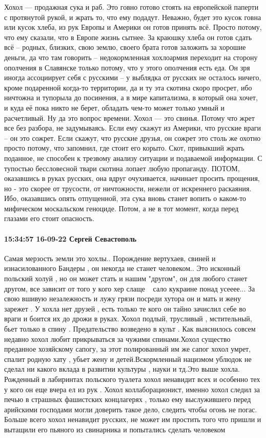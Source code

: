 Хохол — продажная сука и раб.
Это говно готово стоять на европейской паперти с протянутой рукой, и жрать то, что ему подадут. Неважно, будет это кусок говна или кусок хлеба, из рук Европы и Америки он готов принять всё. Просто потому, что ему сказали, что в Европе жизнь сытнее. За краюшку хлеба он готов сдать всё – родных, близких, свою землю, своего брата готов заложить за хорошие деньги, да что там говорить – недокормленная хохлоармия переходит на сторону ополчения в Славянске только потому, что у этого ополчения есть еда. Он зря иногда ассоциирует себя с русскими – у выблядка от русских не осталось ничего, кроме подаренной когда-то территории, да и ту эта скотина скоро просрет, ибо ничтожна и тупорыла до посинения, а в мире капитализма, в который она хочет, и куда её пока никто не берет, обладать чем-то может только умный и расчетливый. Ну да это вопрос времени.
Хохол — это свинья.
Потому что жрет все без разбора, не задумываясь. Если ему скажут из Америки, что русские враги – он это сожрет. Если скажут, что русские друзья, он сожрет это столь же охотно просто потому, что запомнил, где стоит его корыто. Скот, привыкший жрать поданное, не способен к трезвому анализу ситуации и подаваемой информации. С тупостью бессловесной твари скотина лопает любую пропаганду. ПОТОМ, оказавшись в руках русских, она вдруг очухивается, начинает просить прощения, но - это скорее от трусости, от ничтожности, нежели от искреннего раскаяния. Ибо, оказавшись опять отпущенной, эта сука вновь станет вопить о каком-то мифическом москальском геноциде. Потом, а не в тот момент, когда перед глазами его стоит опасность.

\paragraph{15:34:57 16-09-22 Сергей Севастополь}

Самая мерзость земли это хохлы.. Порождение вертухаев, свиней и изнасилованного
Бандеры , он некогда не станет человеком.. Это исконный польский холуй , но он
может стать и нашим "другом", он для любого станет другом, все зависит от того
у кого хер слаще🤢🤢🤢🤢сало кукраине понад усееее... За свою вшивую
незалежность и лужу грязи посреди хутора он и мать и жену зарежет . У хохла нет
друзей , есть только те кого он тайно зачислил себе во враги и боится их до
дрожи в руках. Хохол подлый, трусливый , мстительный, бьет только в спину .
Предательство возведено в культ . Как выяснилось совсем недавно хохол любит
прикрываться за чужими спинами.Хохол существо преданное хозяйскому сапогу, за
этот полированный им же сапог хохол умрет, спалит родную хату , убьет жену и
детей.Вскормленный нацизмом ублюдок не сделал ни какого вклада в развитии
культуры , науки и тд.Это выше хохла. Рожденный в лабиринтах польского туалета
хохол ненавидит всех и особенно тех у кого он еще вчера ел из рук . Хохол
коллаборационист, именно хохол следил за печью в страшных фашистских
концлагерях , только ему выслужившего перед арийскими господами могли доверить
такое дело, следить чтобы огонь не погас. Больше всего хохол ненавидит русских,
не может им простить того что пришли и вытащили его пьяного из свинарника и
попытались сделать человеком

